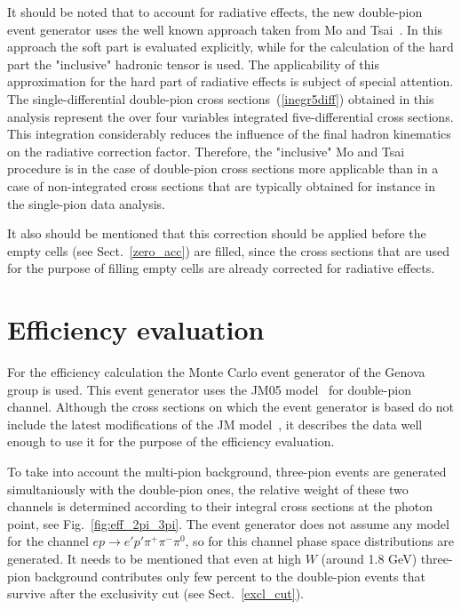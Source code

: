 It should be noted that to account for radiative effects, the new double-pion event generator uses the well
known approach taken from Mo and Tsai~\cite{Mo:1968cg}.
In this approach the soft part is evaluated
explicitly, while for the calculation of the hard part the "inclusive" hadronic
tensor is used. The applicability
of this approximation for the hard part of
radiative effects is subject of special
attention. The single-differential double-pion cross sections~(\ref{inegr5diff}) obtained in this analysis represent the over four
variables integrated five-differential cross sections. This
integration considerably reduces the influence of
the final hadron kinematics on
the radiative correction factor. Therefore,
the "inclusive" Mo and Tsai procedure is in the case of double-pion cross sections more
applicable than in a case
of non-integrated cross sections that are typically obtained for instance in the single-pion data analysis.

It also should be mentioned that this correction should be applied before the empty cells (see Sect.~\ref{zero_acc}) are filled, since the cross sections that are used for the purpose of filling empty cells are already corrected for radiative effects.


\section{Efficiency evaluation}
\label{eff_aval} 

For the efficiency calculation the Monte Carlo event generator of
the Genova group is used. This event generator uses the JM05 model~\cite{JM05} for double-pion channel. Although the cross sections on which the event generator is based do not include the latest modifications of the JM model~\cite{Mokeev:2008iw,Mokeev:2012vsa,Mokeev:2015lda}, it describes the data well enough to use it for the purpose of the efficiency evaluation. 

To take into account the multi-pion background, three-pion events are generated simultaniously with the double-pion ones, the relative weight of these two channels is determined according to their integral cross sections at the photon point, see Fig.~\ref{fig:eff_2pi_3pi}. The event generator does not assume any model for the channel $e p \rightarrow e'p'\pi^{+}\pi^{-}\pi^{0}$, so for this channel phase space distributions are generated. It needs to be mentioned that even at high $W$ (around 1.8 GeV) three-pion background contributes only few percent to the double-pion events that survive after the exclusivity cut (see Sect.~\ref{excl_cut}). 

